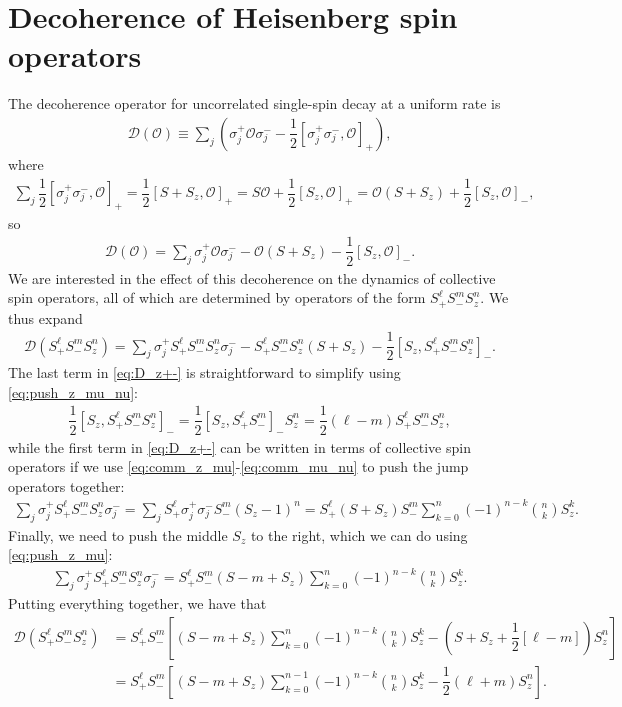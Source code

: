 \documentclass[aps,notitlepage,nofootinbib,11pt]{revtex4-1}
\newcommand{\f}[2]{\dfrac{#1}{#2}} %
\newcommand{\p}[1]{\left(#1\right)} %
\renewcommand{\sp}[1]{\left[#1\right]} %
\newcommand{\D}{\mathcal{D}}
\renewcommand{\O}{\mathcal{O}}
\newcommand{\1}{\mathds{1}}
\begin{document}
\newpage

\section{Decoherence of Heisenberg spin operators}
\label{sec:decoherence}

The decoherence operator for uncorrelated single-spin decay at a
uniform rate is
\begin{align}
  \D\p{\O}
  \equiv \sum_j\p{\sigma_j^+\O\sigma_j^-
    - \f12\sp{\sigma_j^+\sigma_j^-,\O}_+},
\end{align}
where
\begin{align}
  \sum_j \f12\sp{\sigma_j^+\sigma_j^-,\O}_+
  = \f12\sp{S+S_z,\O}_+
  = S\O + \f12\sp{S_z,\O}_+
  = \O\p{S+S_z} + \f12\sp{S_z,\O}_-,
\end{align}
so
\begin{align}
  \D\p{\O}
  = \sum_j \sigma_j^+\O\sigma_j^- - \O\p{S + S_z} - \f12 \sp{S_z,\O}_-.
\end{align}
We are interested in the effect of this decoherence on the dynamics of
collective spin operators, all of which are determined by operators of
the form $S_+^\ell S_-^m S_z^n$.  We thus expand
\begin{align}
  \D\p{S_+^\ell S_-^m S_z^n}
  = \sum_j \sigma_j^+ S_+^\ell S_-^m S_z^n \sigma_j^-
  - S_+^\ell S_-^m S_z^n \p{S + S_z}
  - \f12 \sp{S_z, S_+^\ell S_-^m S_z^n}_-.
  \label{eq:D_z+-}
\end{align}
The last term in \eqref{eq:D_z+-} is straightforward to simplify using
\eqref{eq:push_z_mu_nu}:
\begin{align}
  \f12 \sp{S_z, S_+^\ell S_-^m S_z^n}_-
  = \f12 \sp{S_z, S_+^\ell S_-^m}_- S_z^n
  = \f12 \p{\ell-m} S_+^\ell S_-^m S_z^n,
\end{align}
while the first term in \eqref{eq:D_z+-} can be written in terms of
collective spin operators if we use
\eqref{eq:comm_z_mu}-\eqref{eq:comm_mu_nu} to push the jump operators
together:
\begin{align}
  \sum_j \sigma_j^+ S_+^\ell S_-^m S_z^n \sigma_j^-
  = \sum_j S_+^\ell \sigma_j^+ \sigma_j^- S_-^m \p{S_z-1}^n
  = S_+^\ell \p{S + S_z} S_-^m
  \sum_{k=0}^n \p{-1}^{n-k} { n \choose k } S_z^k.
\end{align}
Finally, we need to push the middle $S_z$ to the right, which we can
do using \eqref{eq:push_z_mu}:
\begin{align}
  \sum_j \sigma_j^+ S_+^\ell S_-^m S_z^n \sigma_j^-
  = S_+^\ell S_-^m \p{S - m + S_z}
  \sum_{k=0}^n \p{-1}^{n-k} { n \choose k } S_z^k.
\end{align}
Putting everything together, we have that
\begin{align}
  \D\p{S_+^\ell S_-^m S_z^n}
  &= S_+^\ell S_-^m \sp{\p{S - m + S_z} \sum_{k=0}^n
    \p{-1}^{n-k} { n \choose k } S_z^k
    - \p{S + S_z + \f12\sp{\ell-m}} S_z^n} \\
  &= S_+^\ell S_-^m \sp{\p{S - m + S_z} \sum_{k=0}^{n-1}
    \p{-1}^{n-k} { n \choose k } S_z^k - \f12 \p{\ell+m} S_z^n}.
\end{align}
\end{document}
